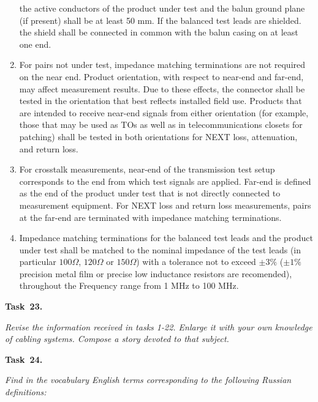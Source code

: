 \begin{enumerate}
    the active conductors of the product under test and the balun ground plane (if present) shall be at
    least 50 mm. If the balanced test leads are shielded. the shield shall be connected in common with
    the balun casing on at least one end.
    \item {For pairs not under test, impedance matching terminations are not required on the near
    end. Product orientation, with respect to near-end and far-end, may affect measurement results. Due
    to these effects, the connector shall be tested in the orientation that best reflects installed field use.
    Products that are intended to receive near-end signals from either orientation (for example, those
    that may be used as TOs as well as in telecommunications closets for patching) shall be tested in
    both orientations for NEXT loss, attenuation, and return loss}.
    \item {For crosstalk measurements, near-end of the transmission test setup corresponds to the
    end from which test signals are applied. Far-end is defined as the end of the product under test that
    is not directly connected to measurement equipment. For NEXT loss and return loss measurements,
    pairs at the far-end are terminated with impedance matching terminations}.
    \item {Impedance matching terminations for the balanced test leads and the product under test
    shall be matched to the nominal impedance of the test leads (in particular $100 \Omega$, $120 \Omega$ or $150 \Omega$)
    with a tolerance not to exceed $\pm 3\%$ ($\pm 1\%$ precision metal film or precise low inductance resistors
    are recomended), throughout the Frequency range from 1 MHz to 100 MHz}.
\end{enumerate}

{\bf Task~23.}~~{\it Revise the information received in tasks 1-22. Enlarge it with your own knowledge
of cabling systems. Compose a story devoted to that subject. \par}

{\bf Task~24.}~~{\it Find in the vocabulary English terms corresponding to the following Russian definitions: \par}

